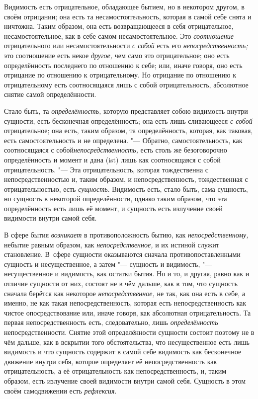 Видимость есть отрицательное, обладающее бытием, но в некотором другом, в
своём отрицании; она есть та несамостоятельность, которая в самой себе
снята и ничтожна. Таким образом, она есть возвращающееся в себя
отрицательное, несамостоятельное, как в себе самом несамостоятельное. Это
{\em соотношение} отрицательного или
несамостоятельности {\em с собой} есть его
{\em непосредственность;} это соотношение есть некое
{\em другое,} чем само это отрицательное; оно есть
определённость последнего по отношению к себе; или, иначе говоря, оно есть
отрицание по отношению к отрицательному. Но отрицание по отношению к
отрицательному есть соотносящаяся лишь с собой отрицательность, абсолютное
снятие самой определённости.

Стало быть, та {\em определённость,} которую
представляет собою видимость внутри сущности, есть бесконечная
определённость; она есть лишь сливающееся {\em с собой}
отрицательное; она есть, таким образом, та определённость, которая, как
таковая, есть самостоятельность и не определена. "--- Обратно,
самостоятельность, как соотносящаяся с собой{\em непосредственность,}
есть столь же безоговорочно определённость и момент и
дана (ist) лишь как соотносящаяся с собой отрицательность. "--- Эта
отрицательность, которая тождественна с непосредственностью и, таким
образом, и непосредственность, тождественная с отрицательностью, есть
{\em сущность}. Видимость есть, стало быть, сама
сущность, но сущность в некоторой определённости, однако таким образом, что
эта определённость есть лишь её момент, и сущность есть излучение своей
видимости внутри самой себя.

В сфере бытия {\em возникает} в противоположность бытию,
как {\em непосредственному,} небытие равным образом,
как {\em непосредственное,} и их истиной служит становление. В~сфере
сущности оказываются сначала противопоставленными сущность и несущественное,
а затем "--- сущность и видимость, "--- несущественное
и видимость, как остатки бытия. Но и то, и другая, равно как и отличие
сущности от них, состоят не в чём дальше, как в том, что сущность сначала
берётся как некоторое {\em непосредственное,} не так,
как она есть в себе, а именно, не как такая непосредственность, которая
есть непосредственность как чистое опосредствование или, иначе говоря, как
абсолютная отрицательность. Та первая непосредственность есть,
следовательно, лишь {\em определённость}
непосредственности. Снятие этой определённости сущности состоит поэтому не
в чём дальше, как в вскрытии того обстоятельства, что несущественное есть
лишь видимость и что сущность содержит в самой себе видимость как
бесконечное движение внутри себя, которое определяет её непосредственность
как отрицательность, а её отрицательность как непосредственность, и, таким
образом, есть излучение своей видимости внутри самой себя. Сущность в этом
своём самодвижении есть {\em рефлексия}.


